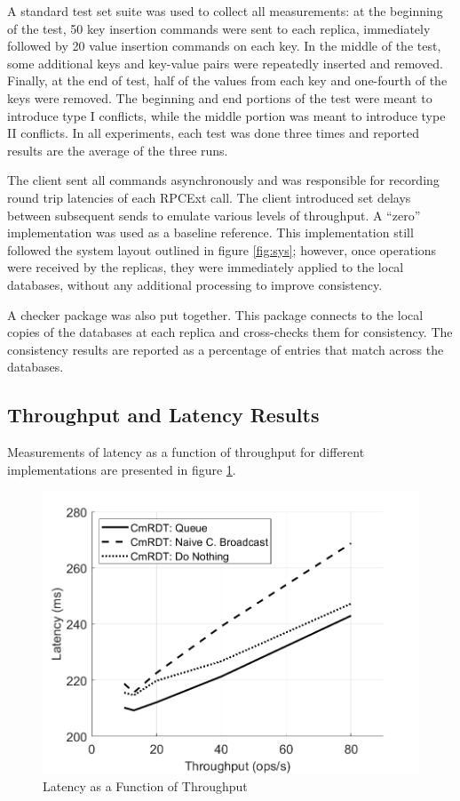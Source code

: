 \documentclass[sigconf,nonacm,11pt]{acmart}
\begin{document}
A standard test set suite was used to collect all measurements: at the beginning of the test, 50 key insertion commands were sent to each replica, immediately followed by 20 value insertion commands on each key. In the middle of the test, some additional keys and key-value pairs were repeatedly inserted and removed. Finally, at the end of test, half of the values from each key and one-fourth of the keys were removed. The beginning and end portions of the test were meant to introduce type I conflicts, while the middle portion was meant to introduce type II conflicts. In all experiments, each test was done three times and reported results are the average of the three runs.

The client sent all commands asynchronously and was responsible for recording round trip latencies of each RPCExt call. The client introduced set delays between subsequent sends to emulate various levels of throughput. A ``zero'' implementation was used as a baseline reference. This implementation still followed the system layout outlined in figure \ref{fig:sys}; however, once operations were received by the replicas, they were immediately applied to the local databases, without any additional processing to improve consistency.

A checker package was also put together. This package connects to the local copies of the databases at each replica and cross-checks them for consistency. The consistency results are reported as a percentage of entries that match across the databases. 

\subsection{Throughput and Latency Results}
Measurements of latency as a function of throughput for different implementations are presented in figure \ref{fig:eval1}.

\begin{figure}[h]
  \centering
  \includegraphics[width=\linewidth]{Fig7Eval1}
  \caption{Latency as a Function of Throughput}
  \label{fig:eval1}
\end{figure}
\end{document}
